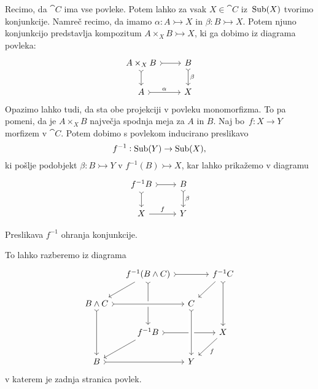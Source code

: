 \documentclass[../kategoricna_logika.tex]{subfiles}
\begin{document}
Recimo, da $\cat{C}$ ima vse povleke.  Potem lahko za vsak
$X \in \cat{C}$ iz~$\operatorname{Sub}(X)$ tvorimo konjunkcije.  Namreč recimo, da
imamo $\alpha : A \rightarrowtail X$ in
${\beta : B \rightarrowtail X}$.  Potem njuno konjunkcijo predstavlja
kompozitum $A \times_X B \rightarrowtail X$, ki ga dobimo iz diagrama
povleka:
\begin{equation*}
  \begin{tikzcd}
    A \times_X B \ar[r, tail] \ar[d, tail] & B \ar[d, tail, "\beta"] \\
    A \ar[r, tail, "\alpha"] & X
  \end{tikzcd}
\end{equation*}
Opazimo lahko tudi, da sta obe projekciji v povleku monomorfizma.  To
pa pomeni, da je $A \times_X B$ največja spodnja meja za $A$ in $B$.
Naj bo~$f : X \to Y$ morfizem v $\cat{C}$.  Potem dobimo s povlekom
inducirano preslikavo
$$f^{-1} : \operatorname{Sub}(Y) \to \operatorname{Sub}(X),$$
ki pošlje podobjekt $\beta : B \rightarrowtail Y$ v
$f^{-1}(B) \rightarrowtail X$, kar lahko prikažemo v diagramu
\begin{equation*}
  \begin{tikzcd}
    f^{-1}B \ar[r, tail] \ar[d, tail] & B \ar[d, tail, "\beta"] \\
    X \ar[r, "f"] & Y
  \end{tikzcd}
\end{equation*}
\begin{lema}
  Preslikava $f^{-1}$ ohranja konjunkcije.
\end{lema}
\begin{dokaz}
  To lahko razberemo iz diagrama
  \begin{equation*}
    \begin{tikzcd}[column sep=small, row sep=normal]
      & f^{-1}(B \land C) \ar[dl] \ar[dd, tail] \ar[rr, tail] & & f^{-1}C \ar[dl] \ar[dd, tail] \\
      B \land C \ar[dd, tail] \ar[rr, crossing over, tail] & & C  & \\
      & f^{-1}B \ar[dl] \ar[rr, tail] & & X \ar[dl, "f"] \\
      B \ar[rr, tail] & & Y \ar[from=uu, crossing over, tail] &
    \end{tikzcd}
  \end{equation*}
  v katerem je zadnja stranica povlek.
\end{dokaz}
\end{document}
